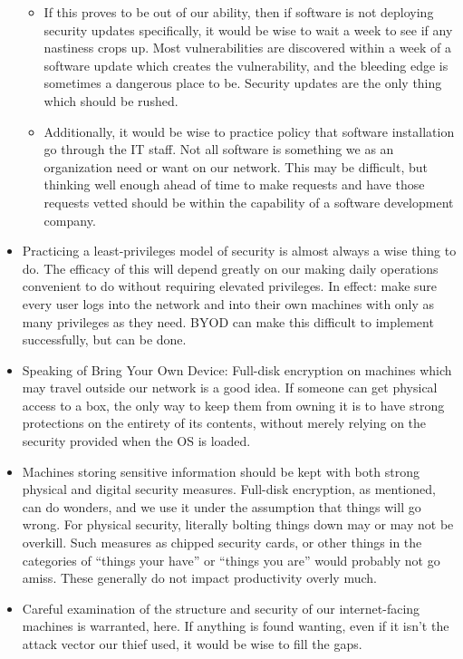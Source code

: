 \begin{itemize}
  \begin{itemize}
  \item
    If this proves to be out of our ability, then if software is not
    deploying security updates specifically, it would be wise to wait a
    week to see if any nastiness crops up. Most vulnerabilities are
    discovered within a week of a software update which creates the
    vulnerability, and the bleeding edge is sometimes a dangerous place
    to be. Security updates are the only thing which should be rushed.
  \item
    Additionally, it would be wise to practice policy that software
    installation go through the IT staff. Not all software is something
    we as an organization need or want on our network. This may be
    difficult, but thinking well enough ahead of time to make requests
    and have those requests vetted should be within the capability of a
    software development company.
  \end{itemize}
\item
  Practicing a least-privileges model of security is almost always a
  wise thing to do. The efficacy of this will depend greatly on our
  making daily operations convenient to do without requiring elevated
  privileges. In effect: make sure every user logs into the network and
  into their own machines with only as many privileges as they need.
  BYOD can make this difficult to implement successfully, but can be
  done.
\item
  Speaking of Bring Your Own Device: Full-disk encryption on machines
  which may travel outside our network is a good idea. If someone can
  get physical access to a box, the only way to keep them from owning it
  is to have strong protections on the entirety of its contents, without
  merely relying on the security provided when the OS is loaded.
\item
  Machines storing sensitive information should be kept with both strong
  physical and digital security measures. Full-disk encryption, as
  mentioned, can do wonders, and we use it under the assumption that
  things will go wrong. For physical security, literally bolting things
  down may or may not be overkill. Such measures as chipped security
  cards, or other things in the categories of ``things your have'' or
  ``things you are'' would probably not go amiss. These generally do not
  impact productivity overly much.
\item
  Careful examination of the structure and security of our
  internet-facing machines is warranted, here. If anything is found
  wanting, even if it isn't the attack vector our thief used, it would
  be wise to fill the gaps.
\end{itemize}
